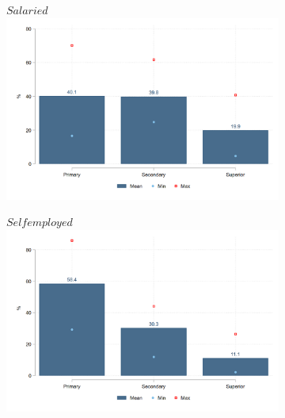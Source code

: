 \documentclass[english]{article}
\begin{document}
\begin{itemize}
\begin{figure}[htb!]
\centering
  \caption{Structure of salaried and self-employed workers}
    \begin{subfigure}{.5\textwidth}
  \centering
    \footnotesize{$Salaried$}
  \includegraphics[width=1\textwidth]{latex/figures/Snapshot/Salaried-education.png}
  \label{fig:salariededuc}
\end{subfigure}%
\begin{subfigure}{.5\textwidth}
  \centering
    \footnotesize{$Self employed$}
  \includegraphics[width=1\textwidth]{latex/figures/Snapshot/Self employed-education.png}
  \label{fig:selfeduc}
\end{subfigure}


\end{figure}
\end{itemize}
\end{document}
